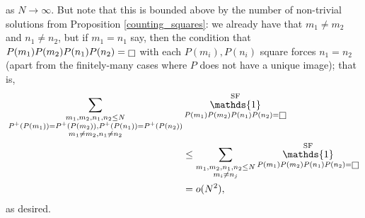 \documentclass[11pts]{amsart}
\numberwithin{equation}{section}
\DeclareMathOperator{\one}{\mathds{1}}
\let\oldsquare\square
\renewcommand{\square}[1][-1pt]{%
 {\raisebox{#1}{$\oldsquare$}}%
}
\begin{document}
as $N\rightarrow\infty$. But note that this is bounded above by the number of non-trivial solutions from Proposition \ref{counting_squares}: we already have that $m_1\neq m_2$ and $n_1\neq n_2$, but if $m_1=n_1$ say, then the condition that $P(m_1)P(m_2)P(n_1)P(n_2)=\square$ with each $P(m_i),P(n_i)$ square forces $n_1=n_2$ (apart from the finitely-many cases where $P$ does not have a unique image); that is,
\begin{align*}
   \sum_{\substack{{m_1,m_2,n_1,n_2\leq N}\\{P^+(P(m_1))=P^+(P(m_2)), P^+(P(n_1))=P^+(P(n_2))}\\{m_1\neq m_2,n_1\neq n_2}}}&\one_{P(m_1)P(m_2)P(n_1)P(n_2)=\square}^{\text{SF}}\\
    &\leq
    \sum_{\substack{{m_1,m_2,n_1,n_2\leq N}\\{m_i\neq n_j}}}\one_{P(m_1)P(m_2)P(n_1)P(n_2)=\square}^{\text{SF}}\\
    &=
    o(N^2),
\end{align*}
as desired.
\end{document}
